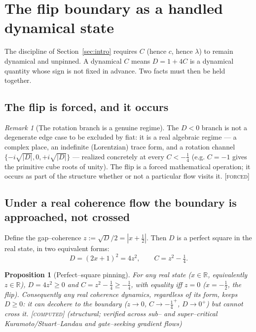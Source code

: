 \documentclass[11pt]{article}
\theoremstyle{plain}
\newtheorem{proposition}[theorem]{Proposition}
\theoremstyle{definition}
\theoremstyle{remark}
\newtheorem{remark}[theorem]{Remark}
\newcommand{\forced}{\textcolor{forcedc}{\textsc{[forced]}}}
\newcommand{\computed}{\textcolor{forcedc}{\textsc{[computed]}}}
\newcommand{\R}{\mathbb{R}}
\newcommand{\abs}[1]{\left\lvert #1 \right\rvert}
\begin{document}
\section{The flip boundary as a handled dynamical state}\label{sec:boundary}

The discipline of Section~\ref{sec:intro} requires $C$ (hence $c$, hence $\lambda$) to remain dynamical and unpinned. A dynamical $C$ means $D=1+4C$ is a dynamical quantity whose sign is not fixed in advance. Two facts must then be held together.

\subsection{The flip is forced, and it occurs}

\begin{remark}[The rotation branch is a genuine regime]\label{rem:occurs}
The $D<0$ branch is not a degenerate edge case to be excluded by fiat: it is a real algebraic regime --- a complex place, an indefinite (Lorentzian) trace form, and a rotation channel $\{-i\sqrt{\abs D},0,+i\sqrt{\abs D}\}$ --- realized concretely at every $C<-\tfrac14$ (e.g. $C=-1$ gives the primitive cube roots of unity). The flip is a forced mathematical operation; it occurs as part of the structure whether or not a particular flow visits it. \forced
\end{remark}

\subsection{Under a real coherence flow the boundary is approached, not crossed}

Define the gap--coherence $z := \sqrt D/2 = \abs{x+\tfrac12}$. Then $D$ is a perfect square in the real state, in two equivalent forms:
\begin{equation}\label{eq:square}
D = (2x+1)^2 = 4z^2, \qquad C = z^2 - \tfrac14 .
\end{equation}

\begin{proposition}[Perfect--square pinning]\label{prop:square}
For any \emph{real} state ($x\in\R$, equivalently $z\in\R$), $D=4z^2\ge0$ and $C=z^2-\tfrac14\ge-\tfrac14$, with equality iff $z=0$ ($x=-\tfrac12$, the flip). Consequently any real coherence dynamics, regardless of its form, keeps $D\ge0$: it can \emph{decohere} to the boundary ($z\to0$, $C\to-\tfrac14^+$, $D\to0^+$) but cannot cross it. \computed{} (structural; verified across sub-- and super--critical Kuramoto/Stuart--Landau and gate--seeking gradient flows)
\end{proposition}
\end{document}
